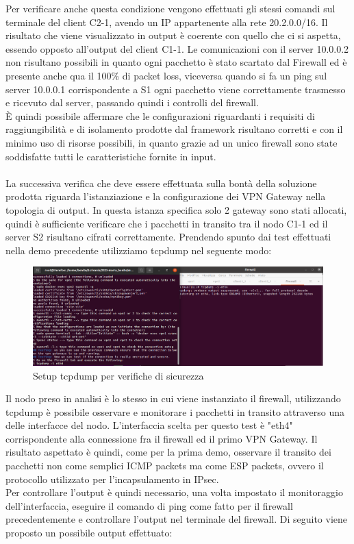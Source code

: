 Per verificare anche questa condizione vengono effettuati gli stessi comandi sul terminale del client C2-1, avendo un IP appartenente alla rete 20.2.0.0/16.
Il risultato che viene visualizzato in output è coerente con quello che ci si aspetta, essendo opposto all'output del client C1-1. Le comunicazioni con il server
10.0.0.2 non risultano possibili in quanto ogni pacchetto è stato scartato dal Firewall ed è presente anche qua il 100\% di packet loss, viceversa quando si fa un ping 
sul server 10.0.0.1 corrispondente a S1 ogni pacchetto viene correttamente trasmesso e ricevuto dal server, passando quindi i controlli del firewall. \\
È quindi possibile affermare che le configurazioni riguardanti i requisiti di raggiungibilità e di isolamento prodotte dal framework risultano corretti e con il minimo uso 
di risorse possibili, in quanto grazie ad un unico firewall sono state soddisfatte tutti le caratteristiche fornite in input. \\ \\
La successiva verifica che deve essere effettuata sulla bontà della soluzione prodotta riguarda l'istanziazione e la configurazione dei VPN Gateway nella topologia di output.
In questa istanza specifica solo 2 gateway sono stati allocati, quindi è sufficiente verificare che i pacchetti in transito tra il nodo C1-1 ed il server S2 risultano cifrati
correttamente. Prendendo spunto dai test effettuati nella demo precedente utilizziamo tcpdump nel seguente modo:

\begin{figure}[H] 
    \centering
    \includegraphics[width=1\textwidth]{(3)Firewall_tcpdump_setup.png} 
    \caption{Setup tcpdump per verifiche di sicurezza}
    \label{fig:Verifica3}
\end{figure}

Il nodo preso in analisi è lo stesso in cui viene instanziato il firewall, utilizzando tcpdump è possibile  osservare e monitorare i pacchetti in transito attraverso una delle interfacce
del nodo. L'interfaccia scelta per questo test è "eth4" corrispondente alla connessione fra il firewall ed il primo VPN Gateway. Il risultato aspettato è quindi, come per la prima demo, osservare
il transito dei pacchetti non come semplici ICMP packets ma come ESP packets, ovvero il protocollo utilizzato per l'incapsulamento in IPsec.\\
Per controllare l'output è quindi necessario, una volta impostato il monitoraggio dell'interfaccia, eseguire il comando di ping come fatto per il firewall precedentemente e controllare l'output 
nel terminale del firewall. Di seguito viene proposto un possibile output effettuato: 



